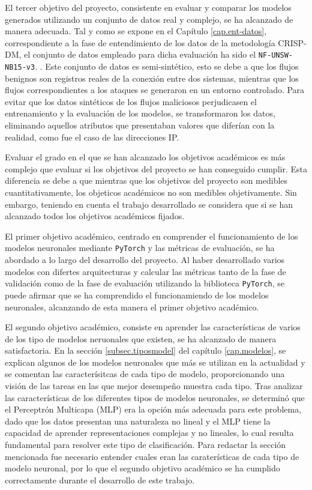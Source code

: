 El tercer objetivo del proyecto, consistente en evaluar y comparar los modelos generados utilizando un conjunto de datos real y complejo, se ha alcanzado de manera adecuada. Tal y como se expone en el Capítulo \ref{cap.ent-datos}, correspondiente a la fase de entendimiento de los datos de la metodología CRISP-DM, el conjunto de datos empleado para dicha evaluación ha sido el \texttt{NF-UNSW-NB15-v3}. \cite{luay2025NetFlowDatasetsV3}. Este conjunto de datos es semi-sintético, esto se debe a que los flujos benignos son registros reales de la conexión entre dos sistemas, mientras que los flujos correspondientes a los ataques se generaron en un entorno controlado. Para evitar que los datos sintéticos de los flujos maliciosos perjudicasen el entrenamiento y la evaluación de los modelos, se transformaron los datos, eliminando aquellos atributos que presentaban valores que diferían con la realidad, como fue el caso de las direcciones IP.

Evaluar el grado en el que se han alcanzado los objetivos académicos es más complejo que evaluar si los objetivos del proyecto se han conseguido cumplir. Esta diferencia se debe a que mientras que los objetivos del proyecto son medibles cuantitativamente, los objeticos académicos no son medibles objetivamente. Sin embargo, teniendo en cuenta el trabajo desarrollado se considera que si se han alcanzado todos los objetivos académicos fijados.

El primer objetivo académico, centrado en comprender el funcionamiento de los modelos neuronales mediante \texttt{PyTorch} y las métricas de evaluación, se ha abordado a lo largo del desarrollo del proyecto. Al haber desarrollado varios modelos con difertes arquitecturas y calcular las métricas tanto de la fase de validación como de la fase de evaluación utilizando la biblioteca \texttt{PyTorch}, se puede afirmar que se ha comprendido el funcionamiendo de los modelos neuronales, alcanzando de esta manera el primer objetivo académico.

El segundo objetivo académico, consiste en aprender las características de varios de los tipo de modelos neruonales que existen, se ha alcanzado de manera satisfactoria. En la sección \ref{subsec.tiposmodel} del capítulo \ref{cap.modelos}, se explican algunos de los modelos neuronales que más se utilizan en la actualidad y se comentan las caracterísitcas de cada tipo de modelo, proporcionando una visión de las tareas en las que mejor desempeño muestra cada tipo. Tras analizar las características de los diferentes tipos de modelos neuronales, se determinó que el Perceptrón Multicapa (MLP) era la opción más adecuada para este problema, dado que los datos presentan una naturaleza no lineal y el MLP tiene la capacidad de aprender representaciones complejas y no lineales, lo cual resulta fundamental para resolver este tipo de clasificación. Para redactar la sección mencionada fue necesario entender cuales eran las caraterísticas de cada tipo de modelo neuronal, por lo que el segundo objetivo académico se ha cumplido correctamente durante el desarrollo de este trabajo.

